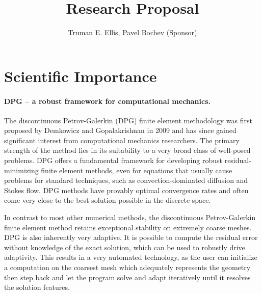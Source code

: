 \documentclass[letterpaper,12pt]{article}
\title{Research Proposal}
\author{Truman E. Ellis, Pavel Bochev (Sponsor)}
\date{}
\begin{document}
\maketitle

\section*{Scientific Importance}
\paragraph{DPG -- a robust framework for computational mechanics.}
The discontinuous Petrov-Galerkin (DPG) finite element methodology was first proposed by Demkowicz and Gopalakrishnan \cite{DPG1,DPG2} 
in 2009 and has since gained significant interest from computational mechanics researchers.
The primary strength of the method lies in its suitability to a very broad class of well-posed problems.
DPG offers a fundamental framework for developing robust residual-minimizing finite element methods, even for equations that usually cause problems
for standard techniques, such as convection-dominated diffusion and Stokes flow.
DPG methods have provably optimal convergence rates and often come very close to the best solution possible in the discrete space.

In contrast to most other numerical methods, the discontinuous Petrov-Galerkin finite element method retains exceptional stability on extremely coarse meshes.
DPG is also inherently very adaptive.
It is possible to compute the residual error without knowledge of the exact solution, which can be used to robustly drive adaptivity.
This results in a very automated technology, as the user can initialize a computation on the coarsest mesh which adequately represents the geometry 
then step back and let the program solve and adapt iteratively until it resolves the solution features.
\end{document}
